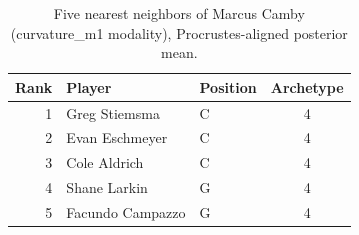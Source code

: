 \begin{table}[htbp]
  \centering\small
  \begin{tabular}{rllc}
    \toprule
    Rank & Player & Position & Archetype \\
    \midrule
    1 & Greg Stiemsma & C & 4 \\
    2 & Evan Eschmeyer & C & 4 \\
    3 & Cole Aldrich & C & 4 \\
    4 & Shane Larkin & G & 4 \\
    5 & Facundo Campazzo & G & 4 \\
    \bottomrule
  \end{tabular}
  \caption{Five nearest neighbors of Marcus Camby (curvature_m1 modality), Procrustes-aligned posterior mean.}
  \label{tab:Marcus_Camby_neighbors_curvature_m1}
\end{table}

